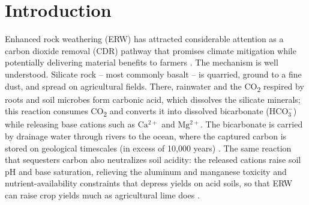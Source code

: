 \documentclass[12pt]{article}
\newcommand{\co}{CO\textsubscript{2}}
\begin{document}
\section{Introduction}\label{sec:intro}

Enhanced rock weathering (ERW) has attracted considerable attention as a carbon
dioxide removal (CDR) pathway that promises climate mitigation while
potentially delivering material benefits to farmers
\citep{beerling2020,beerling2025nree,suhrhoff2026esroc}. The mechanism is well understood.
Silicate rock -- most commonly basalt -- is quarried, ground to a fine dust, and
spread on agricultural fields. There, rainwater and the \co{} respired by roots
and soil microbes form carbonic acid, which dissolves the silicate minerals;
this reaction consumes \co{} and converts it into dissolved bicarbonate
($\mathrm{HCO_3^-}$) while releasing base cations such as $\mathrm{Ca^{2+}}$ and
$\mathrm{Mg^{2+}}$. The bicarbonate is carried by drainage water through rivers
to the ocean, where the captured carbon is stored on geological timescales (in
excess of 10{,}000 years) \citep{beerling2020,renforth2017}. The same reaction
that sequesters carbon also neutralizes soil acidity: the released cations raise
soil pH and base saturation, relieving the aluminum and manganese toxicity and
nutrient-availability constraints that depress yields on acid soils, so that ERW
can raise crop yields much as agricultural lime does
\citep{beerling2024pnas,skov2024,haque2025}.
\end{document}
